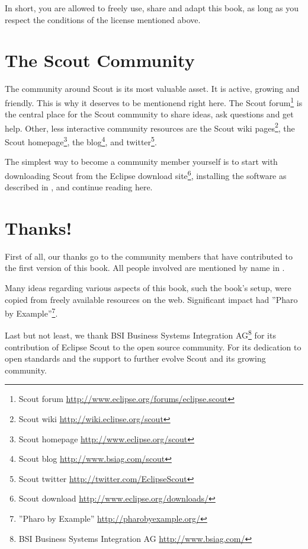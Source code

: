\documentclass[a4paper,10pt,twoside]{book}
\begin{document}
\noindent In short, you are allowed to freely use, share and adapt this book, as long as you respect the conditions of the license mentioned above.

\newpage

\section*{The Scout Community}

The community around Scout is its most valuable asset.
It is active, growing and friendly.
This is why it deserves to be mentionend right here.
The Scout forum\footnote{Scout forum \url{http://www.eclipse.org/forums/eclipse.scout}} is the central place for the Scout community to share ideas, ask questions and get help. 
Other, less interactive community resources are the Scout wiki 
pages\footnote{Scout wiki \url{http://wiki.eclipse.org/scout}}, the Scout 
homepage\footnote{Scout homepage \url{http://www.eclipse.org/scout}}, 
the blog\footnote{Scout blog \url{http://www.bsiag.com/scout}}, and 
twitter\footnote{Scout twitter \url{http://twitter.com/EclipseScout}}.

The simplest way to become a community member yourself is to start with downloading
Scout from the Eclipse download site\footnote{Scout download \url{http://www.eclipse.org/downloads/}}, 
installing the software as described in , and continue reading here.

\section*{Thanks!}

First of all, our thanks go to the community members that have contributed to the first version of this book. 
All people involved are mentioned by name in .

Many ideas regarding various aspects of this book, such the book's setup, were copied from freely available resources on the web. 
Significant impact had ''Pharo by Example''\footnote{''Pharo by Example'' \url{http://pharobyexample.org/}}.

Last but not least, we thank BSI Business Systems Integration 
AG\footnote{BSI Business Systems Integration AG \url{http://www.bsiag.com/}} for its contribution of Eclipse Scout to the open source community.
For its dedication to open standards and the support to further evolve Scout and its growing community.


\ifx\wholebook\relax\else
   
   
\end{document}
